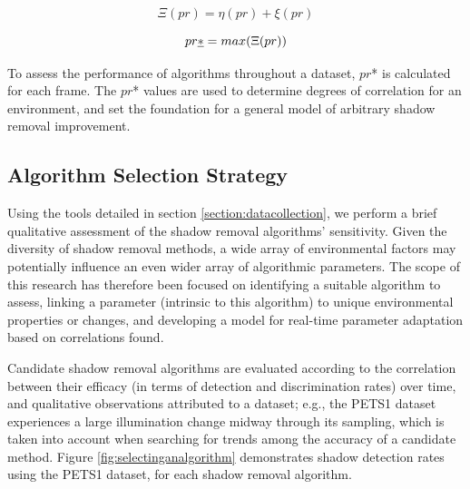 \begin{equation}
\Xi(pr) = \eta(pr) + \xi(pr)
\label{eqn:score}
\end{equation}

\begin{equation}
pr\emph{*} = max(\Xi(pr))
\end{equation}

To assess the performance of algorithms throughout a dataset, $pr$* is calculated for each frame. The $pr$* values are used to determine degrees of correlation for an environment, and set the foundation for a general model of arbitrary shadow removal improvement.

\FloatBarrier
\subsection{Algorithm Selection Strategy} \label{section:selectalgorithm}

Using the tools detailed in section \ref{section:datacollection}, we perform a brief qualitative assessment of the shadow removal algorithms' sensitivity. Given the diversity of shadow removal methods, a wide array of environmental factors may potentially influence an even wider array of algorithmic parameters. The scope of this research has therefore been focused on identifying a suitable algorithm to assess, linking a parameter (intrinsic to this algorithm) to unique environmental properties or changes, and developing a model for real-time parameter adaptation based on correlations found.


Candidate shadow removal algorithms are evaluated according to the correlation between their efficacy (in terms of detection and discrimination rates) over time, and qualitative observations attributed to a dataset; e.g., the PETS1 dataset experiences a large illumination change midway through its sampling, which is taken into account when searching for trends among the accuracy of a candidate method. Figure \ref{fig:selectinganalgorithm} demonstrates shadow detection rates using the PETS1 dataset, for each shadow removal algorithm.

